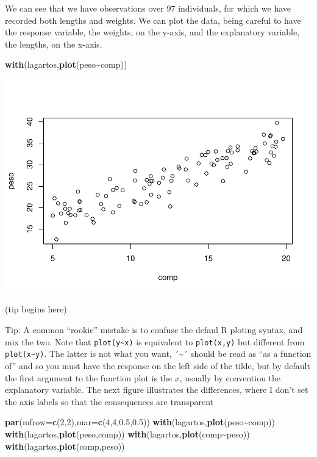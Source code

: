 \documentclass[
]{book}
\newenvironment{Shaded}{\begin{snugshade}}{\end{snugshade}}
\newcommand{\AttributeTok}[1]{\textcolor[rgb]{0.13,0.29,0.53}{#1}}
\newcommand{\DecValTok}[1]{\textcolor[rgb]{0.00,0.00,0.81}{#1}}
\newcommand{\FloatTok}[1]{\textcolor[rgb]{0.00,0.00,0.81}{#1}}
\newcommand{\FunctionTok}[1]{\textcolor[rgb]{0.13,0.29,0.53}{\textbf{#1}}}
\newcommand{\NormalTok}[1]{#1}
\newcommand{\SpecialCharTok}[1]{\textcolor[rgb]{0.81,0.36,0.00}{\textbf{#1}}}
\begin{document}
We can see that we have observations over 97 individuals, for which we have recorded both lengths and weights. We can plot the data, being careful to have the response variable, the weights, on the y-axis, and the explanatory variable, the lengths, on the x-axis.

\begin{Shaded}
\begin{Highlighting}[]
\FunctionTok{with}\NormalTok{(lagartos,}\FunctionTok{plot}\NormalTok{(peso}\SpecialCharTok{\textasciitilde{}}\NormalTok{comp))}
\end{Highlighting}
\end{Shaded}

\includegraphics{ECOMODbook_files/figure-latex/a6.2-1.pdf}

(tip begins here)

Tip: A common ``rookie'' mistake is to confuse the defaul R ploting syntax, and mix the two. Note that \texttt{plot(y\textasciitilde{}x)} is equivalent to \texttt{plot(x,y)} but different from \texttt{plot(x\textasciitilde{}y)}. The latter is not what you want, ´\textasciitilde´ should be read as ``as a function of'' and so you must have the response on the left side of the tilde, but by default the first argument to the function plot is the \(x\), usually by convention the explanatory variable. The next figure illustrates the differences, where I don't set the axis labels so that the consequences are transparent

\begin{Shaded}
\begin{Highlighting}[]
\FunctionTok{par}\NormalTok{(}\AttributeTok{mfrow=}\FunctionTok{c}\NormalTok{(}\DecValTok{2}\NormalTok{,}\DecValTok{2}\NormalTok{),}\AttributeTok{mar=}\FunctionTok{c}\NormalTok{(}\DecValTok{4}\NormalTok{,}\DecValTok{4}\NormalTok{,}\FloatTok{0.5}\NormalTok{,}\FloatTok{0.5}\NormalTok{))}
\FunctionTok{with}\NormalTok{(lagartos,}\FunctionTok{plot}\NormalTok{(peso}\SpecialCharTok{\textasciitilde{}}\NormalTok{comp))}
\FunctionTok{with}\NormalTok{(lagartos,}\FunctionTok{plot}\NormalTok{(peso,comp))}
\FunctionTok{with}\NormalTok{(lagartos,}\FunctionTok{plot}\NormalTok{(comp}\SpecialCharTok{\textasciitilde{}}\NormalTok{peso))}
\FunctionTok{with}\NormalTok{(lagartos,}\FunctionTok{plot}\NormalTok{(comp,peso))}
\end{Highlighting}
\end{Shaded}
\end{document}
